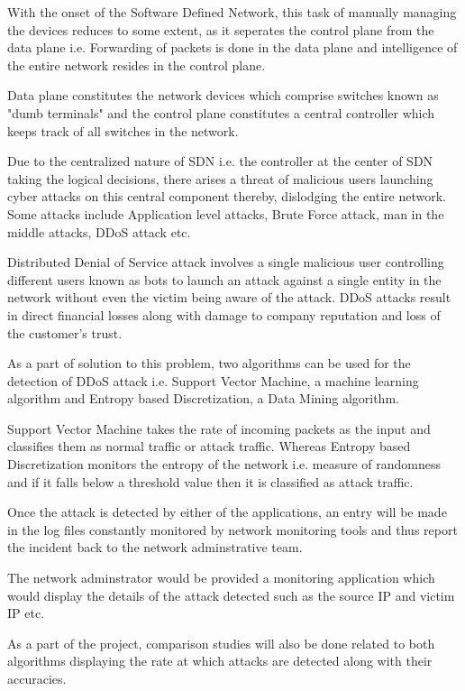 \documentclass[12pt,a4paper,final]{report}
\begin{document}
With the onset of the Software Defined Network, this task of manually managing the devices reduces to some extent, as it seperates the control plane from the data plane i.e. Forwarding of
packets is done in the data plane and intelligence of the entire network resides in the control plane. 

Data plane constitutes the network devices which comprise switches known as "dumb terminals" and the control plane constitutes a central controller which keeps track of all switches in the network.

Due to the centralized nature of SDN i.e. the controller at the center of SDN taking the logical decisions, there arises a threat of malicious users launching cyber attacks on this central component thereby, dislodging the entire network. Some attacks include Application level attacks, Brute Force attack, man in the middle attacks, DDoS attack etc.

Distributed Denial of Service attack involves a single malicious user controlling different users known as bots to launch an attack
against a single entity in the network without even the victim being aware of the attack. DDoS attacks result in direct financial losses along with damage to company reputation and loss of the customer's trust.

As a part of solution to this problem, two algorithms can be used for the detection of DDoS attack i.e. Support Vector Machine, a machine learning algorithm and Entropy based Discretization, a Data Mining algorithm.

Support Vector Machine takes the rate of incoming packets as the input and classifies them as normal traffic or attack traffic. Whereas Entropy based Discretization monitors the entropy of the network i.e. measure of randomness and if it falls below a threshold value then it is classified as attack traffic.

Once the attack is detected by either of the applications, an entry will be made in the log files  constantly monitored by network monitoring tools and thus report the incident back to the network adminstrative team. 

The network adminstrator would be provided a monitoring application which would display the details of the attack detected such as the source IP and victim IP etc.

As a part of the project, comparison studies will also be done related to both algorithms displaying the rate at which attacks are detected along with their accuracies.
\newpage
\end{document}
